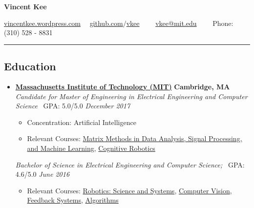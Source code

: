 \documentclass[10pt,letterpaper]{article}
\begin{document}
\begin{center}
{\huge \textbf{Vincent Kee}}

\href{http://vincentkee.wordpress.com}{vincentkee.wordpress.com}\ \ \textbullet
\href{https://github.com/vkee}{ github.com$/$vkee}\ \ \textbullet
\ \ \href{mailto:vkee@mit.edu}{vkee@mit.edu}\ \ \textbullet
\ \  Phone: (310) 528 - 8831
\end{center}

\hrule
\vspace{-0.6em}

\subsection*{Education}
  \begin{itemize}
    \parskip=-0.1em

    \item[]
    {\href{http://mit.edu/}{\textbf{Massachusetts Institute of Technology (MIT)}} \hfill
      \textbf{Cambridge, MA}}
    \\
        {\emph{Candidate for Master of Engineering in Electrical Engineering and Computer Science} \, GPA: 5.0/5.0 \hfill
        \emph{December 2017}} 
        \begin{itemize}	
            \parskip=-0.1em
        \item[] Concentration: Artificial Intelligence
        \item[] Relevant Courses: \href{http://student.mit.edu/catalog/search.cgi?search=18.0651&style=verbatim}{Matrix Methods in Data Analysis, Signal Processing, and Machine Learning}, \href{http://student.mit.edu/catalog/search.cgi?search=6.834&style=verbatim}{Cognitive Robotics}
         \end{itemize}
    {\emph{Bachelor of Science in Electrical Engineering and Computer Science;} \, GPA: 4.6/5.0 \hfill
      \emph{June 2016}}
      \begin{itemize}
          \parskip=-0.1em
      \item[] Relevant Courses: \href{http://student.mit.edu/catalog/search.cgi?search=6.141&style=verbatim}{Robotics: Science and Systems}, \href{http://student.mit.edu/catalog/search.cgi?search=6.869&style=verbatim}{Computer Vision}, \href{http://student.mit.edu/catalog/search.cgi?search=6.302&style=verbatim}{Feedback Systems}, \href{http://student.mit.edu/catalog/search.cgi?search=6.006&style=verbatim}{Algorithms}
   \end{itemize}   
  \end{itemize}
\end{document}

